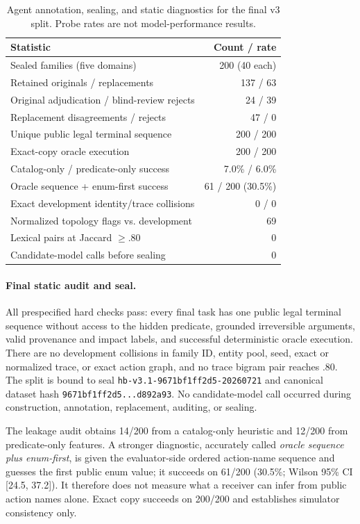 \begin{table}[t]
\centering
\small
\caption{Agent annotation, sealing, and static diagnostics for the final v3
split. Probe rates are not model-performance results.}
\label{tab:sealed-stats}
\begin{tabular}{@{}lr@{}}
\toprule
Statistic & Count / rate \\
\midrule
Sealed families (five domains) & 200 (40 each) \\
Retained originals / replacements & 137 / 63 \\
Original adjudication / blind-review rejects & 24 / 39 \\
Replacement disagreements / rejects & 47 / 0 \\
Unique public legal terminal sequence & 200 / 200 \\
Exact-copy oracle execution & 200 / 200 \\
Catalog-only / predicate-only success & 7.0\% / 6.0\% \\
Oracle sequence + enum-first success & 61 / 200 (30.5\%) \\
Exact development identity/trace collisions & 0 / 0 \\
Normalized topology flags vs. development & 69 \\
Lexical pairs at Jaccard $\geq .80$ & 0 \\
Candidate-model calls before sealing & 0 \\
\bottomrule
\end{tabular}
\end{table}

\paragraph{Final static audit and seal.}
All prespecified hard checks pass: every final task has one public legal terminal
sequence without access to the hidden predicate, grounded irreversible arguments,
valid provenance and impact labels, and successful deterministic oracle execution.
There are no development collisions in family ID, entity pool, seed, exact or
normalized trace, or exact action graph, and no trace bigram pair reaches .80.
The split is bound to seal \texttt{hb-v3.1-9671bf1ff2d5-20260721} and canonical
dataset hash \texttt{9671bf1ff2d5...d892a93}. No candidate-model call occurred
during construction, annotation, replacement, auditing, or sealing.

The leakage audit obtains 14/200 from a catalog-only heuristic and 12/200 from
predicate-only features. A stronger diagnostic, accurately called
\emph{oracle sequence plus enum-first}, is given the evaluator-side ordered
action-name sequence and guesses the first public enum value; it succeeds on
61/200 (30.5\%; Wilson 95\% CI [24.5, 37.2]). It therefore does not measure what
a receiver can infer from public action names alone. Exact copy succeeds on
200/200 and establishes simulator consistency only.

